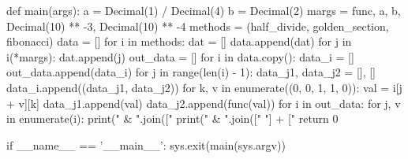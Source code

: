 \documentclass[14pt,a4paper]{extarticle}
\theoremstyle{definition}
\begin{document}
\begin{pythoncode}
def main(args):
    a = Decimal(1) / Decimal(4)
    b = Decimal(2)
    margs = func, a, b, Decimal(10) ** -3, Decimal(10) ** -4
    methods = (half_divide, golden_section, fibonacci)
    data = []
    for i in methods:
        dat = []
        data.append(dat)
        for j in i(*margs):
            dat.append(j)
    out_data = []
    for i in data.copy():
        data_i = []
        out_data.append(data_i)
        for j in range(len(i) - 1):
            data_j1, data_j2 = [], []
            data_i.append((data_j1, data_j2))
            for k, v in enumerate((0, 0, 1, 1, 0)):
                val = i[j + v][k]
                data_j1.append(val)
                data_j2.append(func(val))
    for i in out_data:
        for j, v in enumerate(i):
            print(" & ".join(["%
            print(" & ".join(["   "] + ["%
    return 0

if __name__ == '__main__':
    sys.exit(main(sys.argv))
\end{pythoncode}
\end{document}
